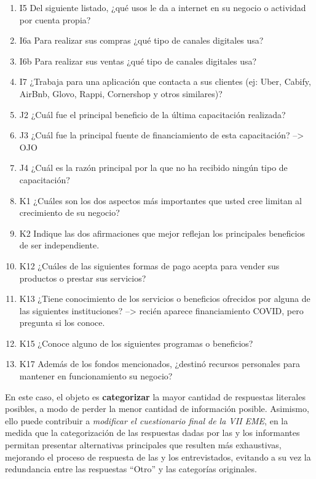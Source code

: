 \documentclass[
]{article}
\begin{document}
\begin{enumerate}
\item
  I5 Del siguiente listado, ¿qué usos le da a internet en su negocio o actividad por cuenta propia?
\item
  I6a Para realizar sus compras ¿qué tipo de canales digitales usa?
\item
  I6b Para realizar sus ventas ¿qué tipo de canales digitales usa?
\item
  I7 ¿Trabaja para una aplicación que contacta a sus clientes (ej: Uber, Cabify, AirBnb, Glovo, Rappi, Cornershop y otros similares)?
\item
  J2 ¿Cuál fue el principal beneficio de la última capacitación realizada?
\item
  J3 ¿Cuál fue la principal fuente de financiamiento de esta capacitación? --\textgreater{} OJO
\item
  J4 ¿Cuál es la razón principal por la que no ha recibido ningún tipo de capacitación?
\item
  K1 ¿Cuáles son los dos aspectos más importantes que usted cree limitan al crecimiento de su negocio?
\item
  K2 Indique las dos afirmaciones que mejor reflejan los principales beneficios de ser independiente.
\item
  K12 ¿Cuáles de las siguientes formas de pago acepta para vender sus productos o prestar sus servicios?
\item
  K13 ¿Tiene conocimiento de los servicios o beneficios ofrecidos por alguna de las siguientes instituciones? --\textgreater{} recién aparece financiamiento COVID, pero pregunta si los conoce.
\item
  K15 ¿Conoce alguno de los siguientes programas o beneficios?
\item
  K17 Además de los fondos mencionados, ¿destinó recursos personales para mantener en funcionamiento su negocio?
\end{enumerate}

En este caso, el objeto es \textbf{categorizar} la mayor cantidad de respuestas literales posibles, a modo de perder la menor cantidad de información posible. Asimismo, ello puede contribuir a \emph{modificar el cuestionario final de la VII EME}, en la medida que la categorización de las respuestas dadas por las y los informantes permitan presentar alternativas principales que resulten más exhaustivas, mejorando el proceso de respuesta de las y los entrevistados, evitando a su vez la redundancia entre las respuestas ``Otro'' y las categorías originales.
\end{document}
